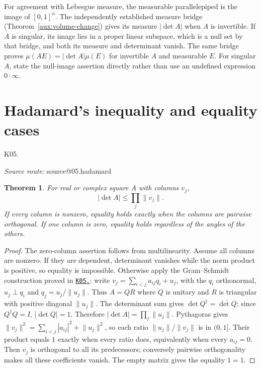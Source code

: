 \documentclass[11pt,a4paper]{book}
\makeatletter
\newtheorem{theorem}{Theorem}[chapter]
\theoremstyle{definition}\newtheorem{definition}[theorem]{Definition}
\theoremstyle{remark}\newtheorem{remark}[theorem]{Remark}
\newcommand{\norm}[1]{\lVert #1\rVert}
\newcommand{\kref}[1]{\hyperref[k:#1]{\texttt{K05.\detokenize{#1}}}}
\newcommand{\Kentry}[2]{\section{#2}\label{k:#1}\noindent\textsf{\small K05.\detokenize{#1}}\par
  \begingroup\small\color{black!65}\textit{Source route: }\csname source@#1\endcsname\par\endgroup}
\makeatother
\begin{document}
For agreement with Lebesgue measure, the measurable parallelepiped is the image of $[0,1]^n$. The independently established measure bridge (Theorem~\ref{aux:volume-change}) gives its measure $|\det A|$ when $A$ is invertible. If $A$ is singular, its image lies in a proper linear subspace, which is a null set by that bridge, and both its measure and determinant vanish. The same bridge proves $\mu(AE)=|\det A|\mu(E)$ for invertible $A$ and measurable $E$. For singular $A$, state the null-image assertion directly rather than use an undefined expression $0\cdot\infty$.

\Kentry{05.hadamard}{Hadamard's inequality and equality cases}
\begin{theorem}
For real or complex square $A$ with columns $v_j$,
\[|\det A|\le\prod_j\norm{v_j}.\]
If every column is nonzero, equality holds exactly when the columns are pairwise orthogonal. If one column is zero, equality holds regardless of the angles of the others.
\end{theorem}
\begin{proof}
The zero-column assertion follows from multilinearity. Assume all columns are nonzero. If they are dependent, determinant vanishes while the norm product is positive, so equality is impossible. Otherwise apply the Gram--Schmidt construction proved in \kref{12.gram_schmidt}: write $v_j=\sum_{i<j}a_{ij}q_i+u_j$, with the $q_i$ orthonormal, $u_j\perp q_i$ and $q_j=u_j/\norm{u_j}$. Thus $A=QR$ where $Q$ is unitary and $R$ is triangular with positive diagonal $\norm{u_j}$. The determinant sum gives $\det Q^\dagger=\overline{\det Q}$; since $Q^\dagger Q=I$, $|\det Q|=1$. Therefore $|\det A|=\prod_j\norm{u_j}$. Pythagoras gives $\norm{v_j}^2=\sum_{i<j}|a_{ij}|^2+\norm{u_j}^2$, so each ratio $\norm{u_j}/\norm{v_j}$ is in $(0,1]$. Their product equals $1$ exactly when every ratio does, equivalently when every $a_{ij}=0$. Then $v_j$ is orthogonal to all its predecessors; conversely pairwise orthogonality makes all these coefficients vanish. The empty matrix gives the equality $1=1$.
\end{proof}
\end{document}
